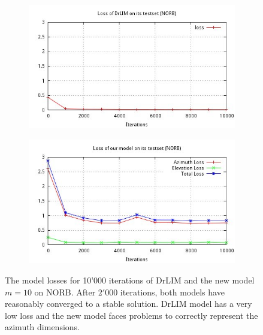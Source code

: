 \documentclass[a4paper,12pt]{report}
\begin{document}
\begin{figure}[h]
    \centering
    \begin{subfigure}{0.45\textwidth}
        \centering
        \includegraphics[width=\textwidth]{thesis_figures/final_loss_testset_3d.jpg}
    \end{subfigure}
    \begin{subfigure}{0.45\textwidth}
        \centering
        \includegraphics[width=\textwidth]{thesis_figures/final_loss_testset_2D1g2.jpg}
    \end{subfigure}
    \caption{The model losses for 10'000 iterations of DrLIM and the new model $m=10$ on NORB.
    After $2'000$ iterations, both models have reasonably converged to a stable solution.
    DrLIM model has a very low loss and the new model faces problems to correctly represent the azimuth dimensions.
    }
    \label{fig:norb_cl2d_loss}
\end{figure}
\end{document}
